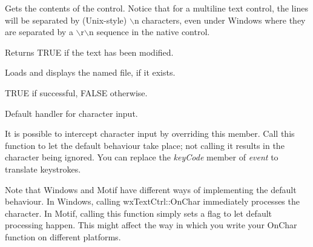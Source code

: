 
Gets the contents of the control. Notice that for a multiline text control,
the lines will be separated by (Unix-style) $\backslash$n characters, even under
Windows where they are separated by a $\backslash$r$\backslash$n sequence in the native control.

\label{wxtextctrlismodified}


Returns TRUE if the text has been modified.

\label{wxtextctrlloadfile}


Loads and displays the named file, if it exists.




TRUE if successful, FALSE otherwise.

\label{wxtextctrlonchar}


Default handler for character input.


It is possible to intercept character
input by overriding this member. Call this function
to let the default behaviour take place; not calling
it results in the character being ignored. You can
replace the {\it keyCode} member of {\it event} to
translate keystrokes.

Note that Windows and Motif have different ways
of implementing the default behaviour. In Windows,
calling wxTextCtrl::OnChar immediately
processes the character. In Motif,
calling this function simply sets a flag
to let default processing happen. This might affect
the way in which you write your OnChar function
on different platforms.



\label{wxtextctrlondropfiles}


